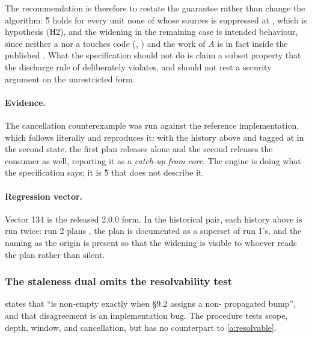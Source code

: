 The recommendation is therefore to restate the guarantee rather than change the
algorithm: \G{5} holds for every unit none of whose sources is suppressed at
\Head{}, which is hypothesis (H2), and the widening in the remaining case is
intended behaviour, since neither a  nor a  touches
code (, ) and the work of $A$ is in fact inside the
published . What the specification should not do is claim a
subset property that the discharge rule of  deliberately violates,
and  should not rest a security argument on the unrestricted form.

\paragraph{Evidence.} The cancellation counterexample was run against the
reference implementation, which follows  literally and reproduces
it: with the history above and  tagged at \Head{} in the second
state, the first plan releases  alone and the second releases the
consumer as well, reporting it as a \emph{catch-up from core}. The engine is
doing what the specification says; it is \G{5} that does not describe it.

\paragraph{Regression vector.} Vector 134 is the released 2.0.0 form. In the historical pair, each history above is run twice: run 2
plans , the plan is documented as a superset of run 1's, and the
 naming  as the origin is present so that the widening is
visible to whoever reads the plan rather than silent.

\subsubsection{The staleness dual omits the resolvability test}

\begin{obligation}
\label{ob:duality}
 states that  ``is non-empty exactly when
\S9.2 assigns  a non- propagated bump'', and that
disagreement is an implementation bug. The procedure tests scope, depth,
window, and cancellation, but has no counterpart to \cref{a:resolvable}.
\end{obligation}

